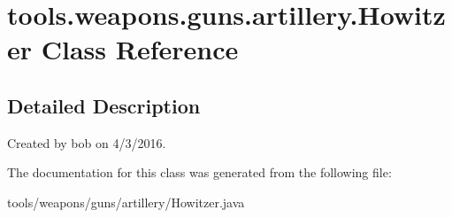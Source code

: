 \hypertarget{classtools_1_1weapons_1_1guns_1_1artillery_1_1_howitzer}{}\section{tools.\+weapons.\+guns.\+artillery.\+Howitzer Class Reference}
\label{classtools_1_1weapons_1_1guns_1_1artillery_1_1_howitzer}


\subsection{Detailed Description}
Created by bob on 4/3/2016. 

The documentation for this class was generated from the following file\+:\begin{DoxyCompactItemize}
\item 
tools/weapons/guns/artillery/Howitzer.\+java\end{DoxyCompactItemize}
